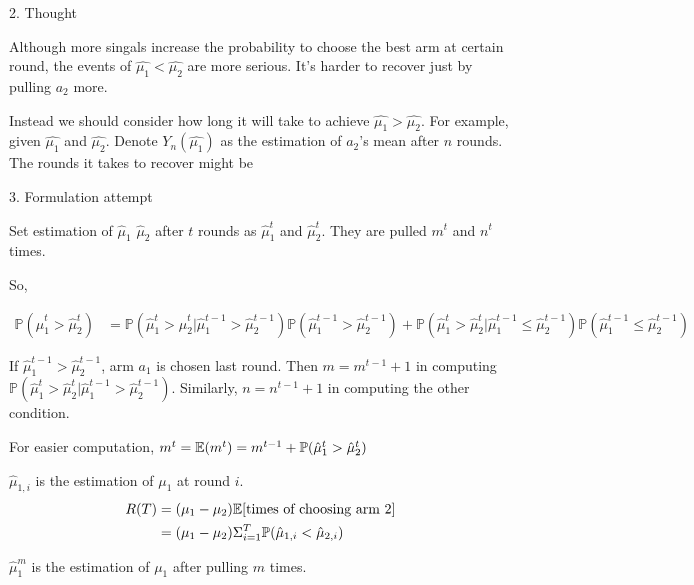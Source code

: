 \documentclass[fleqn]{article}
\def\PP{{\mathbb P}}\def\QQ{{\mathbb Q}}\def\RR{{\mathbb R}}
\begin{document}
2. Thought
\medskip

Although more singals increase the probability to choose the best arm at certain round, the events of $\hat{\mu_1}<\hat{\mu_2}$ are more serious. It's harder to recover just by pulling $a_2$ more.

Instead we should consider how long it will take to achieve $\hat{\mu_1}>\hat{\mu_2}$. For example, given $\hat{\mu_1}$ and $\hat{\mu_2}$. Denote $Y_n(\hat{\mu_1})$ as the estimation of $a_2$'s mean after $n$ rounds. The rounds it takes to recover might be 

\bigskip

3. Formulation attempt
\medskip

Set estimation of $\hat{\mu}_1$ $\hat{\mu}_2$ after $t$ rounds as $\hat{\mu}_1^t$ and $\hat{\mu}_2^t$. They are pulled $m^t$ and $n^t$ times.

So, 

\begin{align*}
\PP(\hat{\mu}_1^t>\hat{\mu}_2^t) &= \PP(\hat{\mu}_1^t>\hat{\mu}_2^t|\hat{\mu}_1^{t-1}>\hat{\mu}_2^{t-1})\PP(\hat{\mu}_1^{t-1}>\hat{\mu}_2^{t-1})+\PP(\hat{\mu}_1^t>\hat{\mu}_2^t|\hat{\mu}_1^{t-1}\leq\hat{\mu}_2^{t-1})\PP(\hat{\mu}_1^{t-1}\leq\hat{\mu}_2^{t-1})
\end{align*}

If $\hat{\mu}_1^{t-1}>\hat{\mu}_2^{t-1}$, arm $a_1$ is chosen last round. Then $m=m^{t-1}+1$ in computing $\PP(\hat{\mu}_1^t>\hat{\mu}_2^t|\hat{\mu}_1^{t-1}>\hat{\mu}_2^{t-1})$. Similarly, $n=n^{t-1}+1$ in computing the other condition.

For easier computation, $m^{t}=\EE(m^{t})=m^{t-1}+\PP(\hat{\mu}_1^{t}>\hat{\mu}_2^{t})$
\clearpage





$\hat{\mu}_{1,i}$ is the estimation of $\mu_1$ at round $i$.
\begin{align*}
R(T)&=(\mu_1-\mu_2)\EE[\text{times of choosing arm 2}]\\
&=(\mu_1-\mu_2)\Sigma_{i=1}^T{\PP(\hat{\mu}_{1,i}<\hat{\mu}_{2,i})}
\end{align*}

$\hat{\mu}_{1}^m$ is the estimation of $\mu_1$ after pulling $m$ times.
\end{document}
